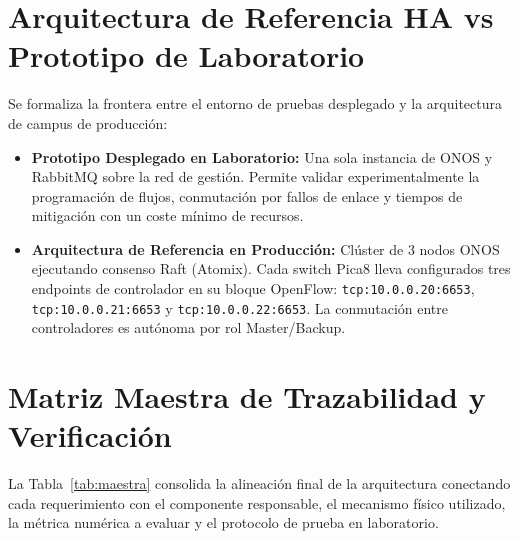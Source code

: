 \documentclass[11pt,a4paper]{report}
\begin{document}
\section{Arquitectura de Referencia HA vs Prototipo de Laboratorio}
Se formaliza la frontera entre el entorno de pruebas desplegado y la arquitectura de campus de producción:
\begin{itemize}[leftmargin=*]
    \item \textbf{Prototipo Desplegado en Laboratorio:} Una sola instancia de ONOS y RabbitMQ sobre la red de gestión. Permite validar experimentalmente la programación de flujos, conmutación por fallos de enlace y tiempos de mitigación con un coste mínimo de recursos.
    \item \textbf{Arquitectura de Referencia en Producción:} Clúster de 3 nodos ONOS ejecutando consenso Raft (Atomix). Cada switch Pica8 lleva configurados tres endpoints de controlador en su bloque OpenFlow: \texttt{tcp:10.0.0.20:6653}, \texttt{tcp:10.0.0.21:6653} y \texttt{tcp:10.0.0.22:6653}. La conmutación entre controladores es autónoma por rol Master/Backup.
\end{itemize}

\section{Matriz Maestra de Trazabilidad y Verificación}
La Tabla~\ref{tab:maestra} consolida la alineación final de la arquitectura conectando cada requerimiento con el componente responsable, el mecanismo físico utilizado, la métrica numérica a evaluar y el protocolo de prueba en laboratorio.
\end{document}
